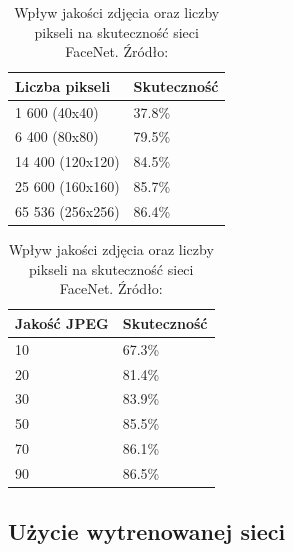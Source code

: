 \begin{table}[H]
    \caption{
        Wpływ jakości zdjęcia oraz liczby pikseli na skuteczność sieci FaceNet.
        Źródło: \cite{schroff2015facenet}
    }
    \label{tab:quality_pixels_to_rate}
    \begin{minipage}{.5\linewidth}
        \centering
        \begin{tabular}{|l|l|}
            \hline
            Liczba pikseli                & Skuteczność \\ \hline
            1 600 \hspace{15px} (40x40)   & 37.8\%                \\ \hline
            6 400 \hspace{15px}     (80x80)    & 79.5\%                \\ \hline
            14 400 \hspace{10px}  (120x120) & 84.5\%                \\ \hline
            25 600 \hspace{10px}  (160x160) & 85.7\%                \\ \hline
            65 536 \hspace{10px}  (256x256) & 86.4\%                \\ \hline
        \end{tabular}
    \end{minipage}%
    \begin{minipage}{.5\linewidth}
        \centering
        \begin{tabular}{|l|l|}
            \hline
            Jakość JPEG & Skuteczność \\ \hline
            10          & 67.3\%      \\ \hline
            20          & 81.4\%      \\ \hline
            30          & 83.9\%      \\ \hline
            50          & 85.5\%      \\ \hline
            70          & 86.1\%      \\ \hline
            90          & 86.5\%      \\ \hline
        \end{tabular}
    \end{minipage}
\end{table}

\subsection{Użycie wytrenowanej sieci}

